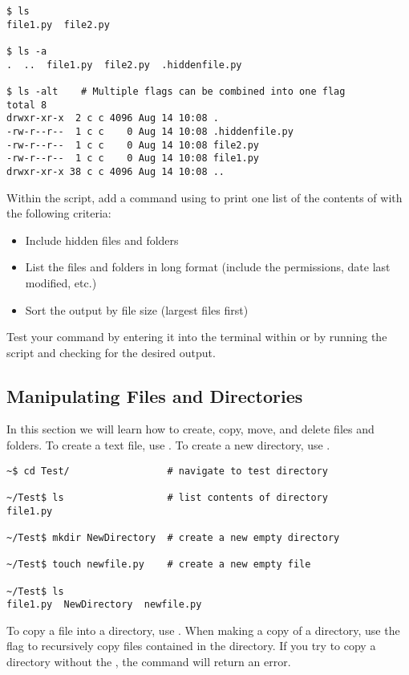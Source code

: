 \begin{lstlisting}
$ ls
file1.py  file2.py

$ ls -a
.  ..  file1.py  file2.py  .hiddenfile.py 

$ ls -alt    # Multiple flags can be combined into one flag
total 8
drwxr-xr-x  2 c c 4096 Aug 14 10:08 .
-rw-r--r--  1 c c    0 Aug 14 10:08 .hiddenfile.py
-rw-r--r--  1 c c    0 Aug 14 10:08 file2.py
-rw-r--r--  1 c c    0 Aug 14 10:08 file1.py
drwxr-xr-x 38 c c 4096 Aug 14 10:08 ..
\end{lstlisting}



\begin{problem}
Within the script, add a command using  to print one list of the contents of  with the following criteria:
\begin{itemize}
	\item Include hidden files and folders
	\item List the files and folders in long format (include the permissions, date last modified, etc.)
	\item Sort the output by file size (largest files first)
\end{itemize}
Test your command by entering it into the terminal within  or by running the script and checking for the desired output.
\label{problem:ls-flags}
\end{problem}


\subsection*{Manipulating Files and Directories} %

In this section we will learn how to create, copy, move, and delete files and folders.
To create a text file, use .
To create a new directory, use .

\begin{lstlisting}
~$ cd Test/					# navigate to test directory

~/Test$ ls					# list contents of directory
file1.py

~/Test$ mkdir NewDirectory	# create a new empty directory

~/Test$ touch newfile.py	# create a new empty file

~/Test$ ls
file1.py  NewDirectory  newfile.py
\end{lstlisting}

To copy a file into a directory, use .
When making a copy of a directory, use the   flag to recursively copy files contained in the directory. 
If you try to copy a directory without the , the command will return an error.

